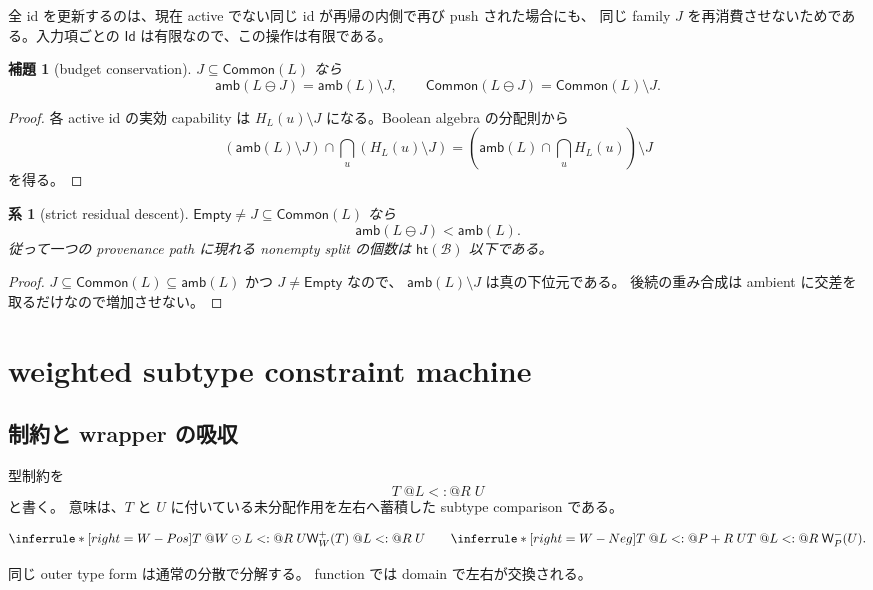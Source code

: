 \documentclass[uplatex,dvipdfmx,a4paper,10.5pt]{jsarticle}
\makeatletter
\theoremstyle{jpplain}
\newtheorem{lemma}[definition]{補題}
\newtheorem{corollary}[definition]{系}
\newcommand{\Id}{\mathsf{Id}}
\newcommand{\Empty}{\mathsf{Empty}}
\newcommand{\Common}{\mathsf{Common}}
\newcommand{\PWeight}[2]{\mathsf{W}^{+}_{#1}(#2)}
\newcommand{\NWeight}[2]{\mathsf{W}^{-}_{#1}(#2)}
\newcommand{\wsub}[4]{#1\;@#2\mathrel{<:}@#3\;#4}
\newcommand{\Caps}{\mathcal B}
\newcommand{\amb}{\mathsf{amb}}
\newcommand{\height}{\mathsf{ht}}
\makeatother
\begin{document}
全 id を更新するのは、現在 active でない同じ id が再帰の内側で再び push された場合にも、
同じ family $J$ を再消費させないためである。入力項ごとの $\Id$ は有限なので、この操作は有限である。

\begin{lemma}[budget conservation]\label{lem:budget-conservation}
$J\subseteq\Common(L)$ なら
\[
  \amb(L\ominus J)=\amb(L)\setminus J,
  \qquad
  \Common(L\ominus J)=\Common(L)\setminus J.
\]
\end{lemma}

\begin{proof}
各 active id の実効 capability は
$H_L(u)\setminus J$ になる。Boolean algebra の分配則から
\[
 (\amb(L)\setminus J)\cap
 \bigcap_u(H_L(u)\setminus J)
 =\left(\amb(L)\cap\bigcap_uH_L(u)\right)\setminus J
\]
を得る。
\end{proof}

\begin{corollary}[strict residual descent]\label{cor:strict-residual-descent}
$\Empty\neq J\subseteq\Common(L)$ なら
\[
  \amb(L\ominus J)<\amb(L).
\]
従って一つの provenance path に現れる nonempty split の個数は
$\height(\Caps)$ 以下である。
\end{corollary}

\begin{proof}
$J\subseteq\Common(L)\subseteq\amb(L)$ かつ $J\neq\Empty$ なので、
$\amb(L)\setminus J$ は真の下位元である。
後続の重み合成は ambient に交差を取るだけなので増加させない。
\end{proof}

\section{weighted subtype constraint machine}

\subsection{制約と wrapper の吸収}

型制約を
\[
  \wsub{T}{L}{R}{U}
\]
と書く。
意味は、$T$ と $U$ に付いている未分配作用を左右へ蓄積した subtype comparison である。

\[
\inferrule*[right=W-Pos]
 {\wsub{T}{W\odot L}{R}{U}}
 {\wsub{\PWeight{W}{T}}{L}{R}{U}}
\qquad
\inferrule*[right=W-Neg]
 {\wsub{T}{L}{P+R}{U}}
 {\wsub{T}{L}{R}{\NWeight{P}{U}}}.
\]

同じ outer type form は通常の分散で分解する。
function では domain で左右が交換される。
\end{document}
